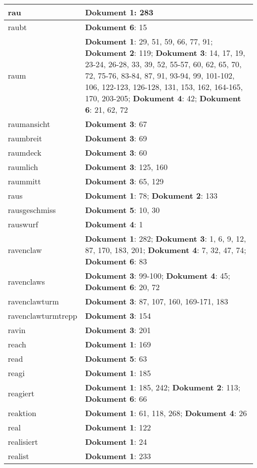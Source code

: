 \documentclass[a5paper]{article}
\begin{document}
\begin{longtable}[l]{|l|p{3in}|}
\hline
rau & \textbf{Dokument 1}: 283 \\
\hline
raubt & \textbf{Dokument 6}: 15 \\
\hline
raum & \textbf{Dokument 1}: 29, 51, 59, 66, 77, 91; \textbf{Dokument 2}: 119; \textbf{Dokument 3}: 14, 17, 19, 23-24, 26-28, 33, 39, 52, 55-57, 60, 62, 65, 70, 72, 75-76, 83-84, 87, 91, 93-94, 99, 101-102, 106, 122-123, 126-128, 131, 153, 162, 164-165, 170, 203-205; \textbf{Dokument 4}: 42; \textbf{Dokument 6}: 21, 62, 72 \\
\hline
raumansicht & \textbf{Dokument 3}: 67 \\
\hline
raumbreit & \textbf{Dokument 3}: 69 \\
\hline
raumdeck & \textbf{Dokument 3}: 60 \\
\hline
raumlich & \textbf{Dokument 3}: 125, 160 \\
\hline
raummitt & \textbf{Dokument 3}: 65, 129 \\
\hline
raus & \textbf{Dokument 1}: 78; \textbf{Dokument 2}: 133 \\
\hline
rausgeschmiss & \textbf{Dokument 5}: 10, 30 \\
\hline
rauswurf & \textbf{Dokument 4}: 1 \\
\hline
ravenclaw & \textbf{Dokument 1}: 282; \textbf{Dokument 3}: 1, 6, 9, 12, 87, 170, 183, 201; \textbf{Dokument 4}: 7, 32, 47, 74; \textbf{Dokument 6}: 83 \\
\hline
ravenclaws & \textbf{Dokument 3}: 99-100; \textbf{Dokument 4}: 45; \textbf{Dokument 6}: 20, 72 \\
\hline
ravenclawturm & \textbf{Dokument 3}: 87, 107, 160, 169-171, 183 \\
\hline
ravenclawturmtrepp & \textbf{Dokument 3}: 154 \\
\hline
ravin & \textbf{Dokument 3}: 201 \\
\hline
reach & \textbf{Dokument 1}: 169 \\
\hline
read & \textbf{Dokument 5}: 63 \\
\hline
reagi & \textbf{Dokument 1}: 185 \\
\hline
reagiert & \textbf{Dokument 1}: 185, 242; \textbf{Dokument 2}: 113; \textbf{Dokument 6}: 66 \\
\hline
reaktion & \textbf{Dokument 1}: 61, 118, 268; \textbf{Dokument 4}: 26 \\
\hline
real & \textbf{Dokument 1}: 122 \\
\hline
realisiert & \textbf{Dokument 1}: 24 \\
\hline
realist & \textbf{Dokument 1}: 233 \\

\end{longtable}
\end{document}
